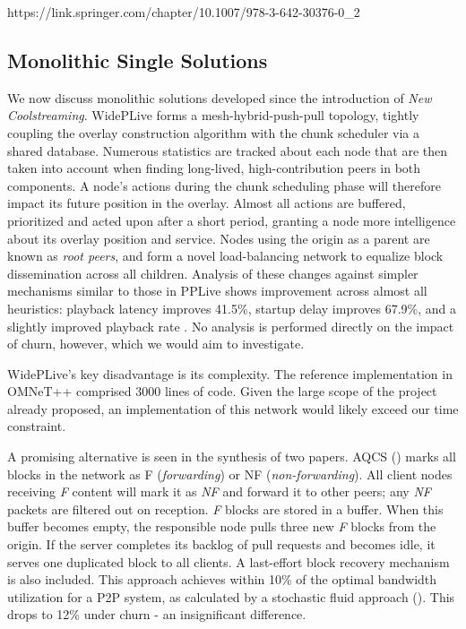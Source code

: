 \documentclass[12pt,a4paper]{article}
\begin{document}
\label{litreview:specifics}
https://link.springer.com/chapter/10.1007/978-3-642-30376-0\_2
\subsection{Monolithic Single Solutions} \label{litreview:monoliths}
We now discuss monolithic solutions developed since the introduction of \textit{New Coolstreaming}. WidePLive forms a mesh-hybrid-push-pull topology, tightly coupling the overlay construction algorithm with the chunk scheduler via a shared database. Numerous statistics are tracked about each node that are then taken into account when finding long-lived, high-contribution peers in both components. A node's actions during the chunk scheduling phase will therefore impact its future position in the overlay. Almost all actions are buffered, prioritized and acted upon after a short period, granting a node more intelligence about its overlay position and service. Nodes using the origin as a parent are known as \textit{root peers}, and form a novel load-balancing network to equalize block dissemination across all children. Analysis of these changes against simpler mechanisms similar to those in PPLive shows improvement across almost all heuristics: playback latency improves 41.5\%, startup delay improves 67.9\%, and a slightly improved playback rate . No analysis is performed directly on the impact of churn, however, which we would aim to investigate.

WidePLive's key disadvantage is its complexity. The reference implementation in OMNeT++ comprised 3000 lines of code. Given the large scope of the project already proposed, an implementation of this network would likely exceed our time constraint.

A promising alternative is seen in the synthesis of two papers. AQCS (\cite{Guo2008}) marks all blocks in the network as F (\textit{forwarding}) or NF (\textit{non-forwarding}). All client nodes receiving \textit{F} content will mark it as \textit{NF} and forward it to other peers; any \textit{NF} packets are filtered out on reception. \textit{F} blocks are stored in a buffer. When this buffer becomes empty, the responsible node pulls three new \textit{F} blocks from the origin. If the server completes its backlog of pull requests and becomes idle, it serves one duplicated block to all clients. A last-effort block recovery mechanism is also included. This approach achieves within 10\% of the optimal bandwidth utilization for a P2P system, as calculated by a stochastic fluid approach (\cite{Kumar2007}). This drops to 12\% under churn - an insignificant difference.
\end{document}
